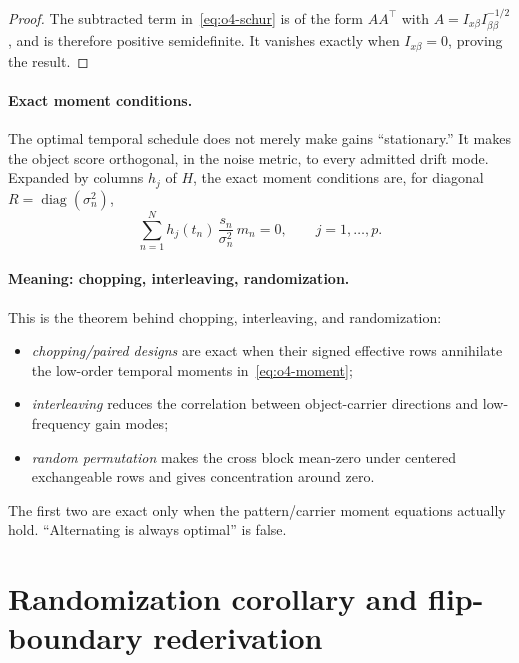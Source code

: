 \documentclass[11pt]{article}
\newcommand{\diag}{\operatorname{diag}}
\theoremstyle{remark}
\begin{document}
\begin{proof}
The subtracted term in~\eqref{eq:o4-schur} is of the form $AA^\top$ with
$A = I_{x\beta} I_{\beta\beta}^{-1/2}$, and is therefore positive semidefinite.
It vanishes exactly when $I_{x\beta}=0$, proving the result.
\end{proof}

\paragraph{Exact moment conditions.}
The optimal temporal schedule does not merely make gains ``stationary.'' It
makes the object score orthogonal, in the noise metric, to every admitted drift
mode. Expanded by columns $h_j$ of $H$, the exact moment conditions are, for
diagonal $R = \diag(\sigma_n^2)$,
\begin{equation}
\sum_{n=1}^N h_j(t_n)\, \frac{s_n}{\sigma_n^2}\, m_n = 0,
\qquad j = 1,\ldots,p.
\tag{O4.4}\label{eq:o4-moment}
\end{equation}

\paragraph{Meaning: chopping, interleaving, randomization.}
This is the theorem behind chopping, interleaving, and randomization:
\begin{itemize}
\item \emph{chopping/paired designs} are exact when their signed effective rows
annihilate the low-order temporal moments in~\eqref{eq:o4-moment};
\item \emph{interleaving} reduces the correlation between object-carrier
directions and low-frequency gain modes;
\item \emph{random permutation} makes the cross block mean-zero under centered
exchangeable rows and gives concentration around zero.
\end{itemize}
The first two are exact only when the pattern/carrier moment equations actually
hold. ``Alternating is always optimal'' is false.

\section{Randomization corollary and flip-boundary rederivation}
\label{sec:o4-rand}
\end{document}
